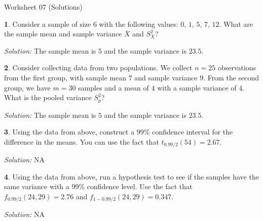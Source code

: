 \documentclass{tufte-handout}
\begin{document}
\justify

{\LARGE Worksheet 07 (Solutions)}

\vspace*{18pt}


\textbf{1}. Consider a sample of size $6$ with the following values: $0$, $1$, $5$, $7$, $12$.
What are the sample mean and sample variance $\bar{X}$ and $S^2_X$?


\textit{Solution:} The sample mean is $5$ and the sample variance is $23.5$.

\textbf{2}. Consider collecting data from two populations. We collect $n=25$ observations
from the first group, with sample mean $7$ and sample variance $9$. From the 
second group, we have $m=30$ samples and a mean of $4$ with a sample variance
of $4$. What is the pooled variance $S^2_p$?

\textit{Solution:} The sample mean is $5$ and the sample variance is $23.5$.

\textbf{3}. Using the data from above, construct a $99$\% confidence interval for the 
difference in the means. You can use the fact that $t_{0.99/2}(54) = 2.67$. 


\textit{Solution:} NA

\textbf{4}. Using the data from above, run a hypothesis test to see if the samples have the
same variance with a $99$\% confidence level. Use the fact that
$f_{0.99/2}(24, 29) = 2.76$ and $f_{1-0.99/2}(24, 29) = 0.347$. 


\textit{Solution:} NA
\end{document}
